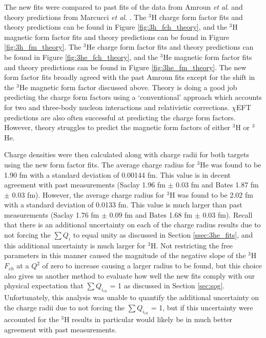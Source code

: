 The new fits were compared to past fits of the data from Amroun \textit{et al}. \cite{Article:Amroun} and theory predictions from Marcucci \textit{et al}. \cite{Article:Marcucci}. The $^3$H charge form factor fits and theory predictions can be found in Figure \ref{fig:3h_fch_theory}, and the $^3$H magnetic form factor fits and theory predictions can be found in Figure \ref{fig:3h_fm_theory}. The $^3$He charge form factor fits and theory predictions can be found in Figure \ref{fig:3he_fch_theory}, and the $^3$He magnetic form factor fits and theory predictions can be found in Figure \ref{fig:3he_fm_theory}. The new form factor fits broadly agreed with the past Amroun fits except for the shift in the $^3$He magnetic form factor discussed above. Theory is doing a good job predicting the charge form factors using a `conventional' approach which accounts for two and three-body nucleon interactions and relativistic corrections. $\chi$EFT predictions are also often successful at predicting the charge form factors. However, theory struggles to predict the magnetic form factors of either $^3$H or $^3$He. 

Charge densities were then calculated along with charge radii for both targets using the new form factor fits. The average charge radius for $^3$He was found to be 1.90 fm with a standard deviation of 0.00144 fm. This value is in decent agreement with past measurements (Saclay 1.96 fm $\pm$ 0.03 fm and Bates 1.87 fm $\pm$ 0.03 fm). However, the average charge radius for $^3$H was found to be 2.02 fm with a standard deviation of 0.0133 fm. This value is much larger than past measurements (Saclay 1.76 fm $\pm$ 0.09 fm and Bates 1.68 fm $\pm$ 0.03 fm). Recall that there is an additional uncertainty on each of the charge radius results due to not forcing the $\sum Q_i$ to equal unity as discussed in Section \ref{ssec:3he_fits}, and this additional uncertainty is much larger for $^3$H. Not restricting the free parameters in this manner caused the magnitude of the negative slope of the $^3$H $F_{ch}$ at a $Q^2$ of zero to increase causing a larger radius to be found, but this choice also gives us another method to evaluate how well the new fits comply with our physical expectation that $\sum Q_{i_{ch}}$ = 1 as discussed in Section \ref{sec:sog}. Unfortunately, this analysis was unable to quantify the additional uncertainty on the charge radii due to not forcing the $\sum Q_{i_{ch}}$ = 1, but if this uncertainty were accounted for the $^3$H results in particular would likely be in much better agreement with past measurements. %

